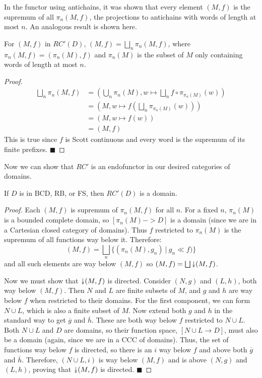 In the functor using antichains, it was shown that every element $(M,f)$ is the supremum of all $\pi_n(M,f)$, the projections to antichains with words of length at most $n$.  An analogous result is shown here. 
\begin{lemma}
For $(M,f)$ in $RC'(D)$, $(M,f) = \bigsqcup_n \pi_n(M,f)$, where $\pi_n(M,f) = (\pi_n(M), f)$ and $\pi_n(M)$ is the subset of $M$ only containing words of length at most $n$.
\end{lemma}
\begin{proof}
\begin{align*}
\bigsqcup_n \pi_n(M,f) &= (\bigcup_n \pi_n(M), w\mapsto \bigsqcup_n f\circ \pi_{\pi_n(M)}(w)) \\
&= (M, w\mapsto f(\bigsqcup_n \pi_{\pi_n(M)}(w))) \\
&= (M, w\mapsto f(w)) \\
&= (M,f) 
\end{align*}
This is true since $f$ is Scott continuous and every word is the supremum of its finite prefixes.
\hfill $\blacksquare$
\end{proof}

Now we can show that $RC'$ is an endofunctor in our desired categories of domains.
\begin{proposition}
If $D$ is in \textsf{BCD}, \textsf{RB}, or \textsf{FS}, then $RC'(D)$ is a domain.
\end{proposition}
\begin{proof}
Each $(M,f)$ is supremum of $\pi_n(M,f)$ for all $n$.  For a fixed $n$, $\pi_n(M)$ is a bounded complete domain, so $[\pi_n(M)->D]$ is a domain (since we are in a Cartesian closed category of domains).  Thus $f$ restricted to $\pi_n(M)$ is the supremum of all functions way below it.  Therefore:  \[(M,f) = \bigsqcup_n \{(\pi_n(M), g_n)\ |\ g_n\ll f)\}\] and all such elements are way below $(M,f)$ so $(M,f) = \bigsqcup \Da (M,f)$.  

Now we must show that $\Da (M,f)$ is directed.  Consider $(N,g)$ and $(L,h)$, both way below $(M,f)$.  Then $N$ and $L$ are finite subsets of $M$, and $g$ and $h$ are way below $f$ when restricted to their domains.  For the first component, we can form $N\cup L$, which is also a finite subset of $M$.  Now extend both $g$ and $h$ in the standard way to get $\overline{g}$ and $\overline{h}$.  These are both way below $f$ restricted to $N\cup L$.  Both $N\cup L$ and $D$ are domains, so their function space, $[N\cup L\to D]$, must also be a domain (again, since we are in a CCC of domains).  Thus, the set of functions way below $f$ is directed, so there is an $i$ way below $f$ and above both $\overline{g}$ and $\overline{h}$.  Therefore, $(N\cup L, i)$ is way below $(M,f)$ and is above $(N,g)$ and $(L,h)$, proving that $\Da (M,f)$ is directed.
\hfill $\blacksquare$
\end{proof}

